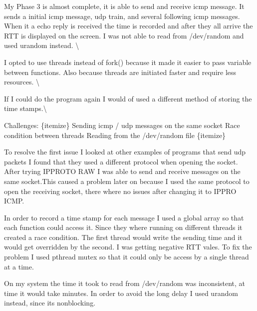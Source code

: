 My Phase 3 is almost complete, it is able to send and receive icmp message. It sends a initial icmp message, udp train, and several following icmp messages. When it a echo reply is received the time is recorded and after they all arrive the R\-T\-T is displayed on the screen. I was not able to read from /dev/random and used urandom instead. \textbackslash{}

I opted to use threads instead of fork() because it made it easier to pass variable between functions. Also because threads are initiated faster and require less resources. \textbackslash{}

If I could do the program again I would of used a different method of storing the time stamps.\textbackslash{}

Challenges\-: \{itemize\}  Sending icmp / udp messages on the same socket  Race condition between threads  Reading from the /dev/random file \{itemize\}

To resolve the first issue I looked at other examples of programs that send udp packets I found that they used a different protocol when opening the socket. After trying I\-P\-P\-R\-O\-T\-O R\-A\-W I was able to send and receive messages on the same socket.\-This caused a problem later on because I used the same protocol to open the receiving socket, there where no issues after changing it to I\-P\-P\-R\-O I\-C\-M\-P.

In order to record a time stamp for each message I used a global array so that each function could access it. Since they where running on different threads it created a race condition. The first thread would write the sending time and it would get overridden by the second. I was getting negative R\-T\-T vales. To fix the problem I used pthread mutex so that it could only be access by a single thread at a time.

On my system the time it took to read from /dev/random was inconsistent, at time it would take minutes. In order to avoid the long delay I used urandom instead, since its nonblocking. 